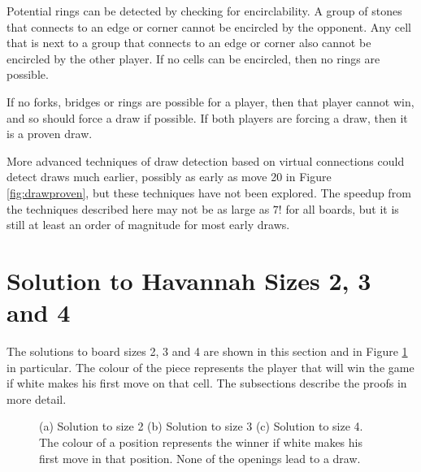 Potential rings can be detected by checking for encirclability. A group of stones that connects to an edge or corner cannot be encircled by the opponent. Any cell that is next to a group that connects to an edge or corner also cannot be encircled by the other player. If no cells can be encircled, then no rings are possible.

If no forks, bridges or rings are possible for a player, then that player cannot win, and so should force a draw if possible. If both players are forcing a draw, then it is a proven draw.

More advanced techniques of draw detection based on virtual connections could detect draws much earlier, possibly as early as move 20 in Figure \ref{fig:drawproven}, but these techniques have not been explored. The speedup from the techniques described here may not be as large as $7!$ for all boards, but it is still at least an order of magnitude for most early draws.


\section{Solution to Havannah Sizes 2, 3 and 4}

The solutions to board sizes 2, 3 and 4 are shown in this section and in Figure \ref{fig:solutionboard} in particular. The colour of the piece represents the player that will win the game if white makes his first move on that cell. The subsections describe the proofs in more detail.

\begin{figure}[tb]
\centering
\caption{(a) Solution to size 2 (b) Solution to size 3 (c) Solution to size 4. The colour of a position represents the winner if white makes his first move in that position. None of the openings lead to a draw.}
\label{fig:solutionboard}
\end{figure}


